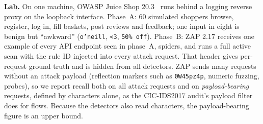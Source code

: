 \documentclass[conference]{IEEEtran}
\begin{document}
\textbf{Lab.} On one machine, OWASP Juice Shop 20.3~\cite{juiceshop} runs behind a logging reverse proxy
on the loopback interface. Phase~A: 60 simulated shoppers browse, register, log in, fill baskets, post
reviews and feedback; one input in eight is benign but ``awkward'' (\texttt{o'neill}, \texttt{<3},
\texttt{50\% off}). Phase~B: ZAP 2.17 receives one example of every API endpoint seen in phase~A,
spiders, and runs a full active scan with the rule ID injected into every attack request. That
header gives per-request ground truth and is hidden from all detectors.
ZAP sends many requests without an attack payload (reflection markers such as \texttt{0W45pz4p},
numeric fuzzing, probes), so we report recall both on all attack requests and on
\emph{payload-bearing} requests, defined by characters alone, as the CIC-IDS2017 audit's payload filter
does for flows. Because the detectors also read characters, the payload-bearing figure is an upper bound.

\end{document}
